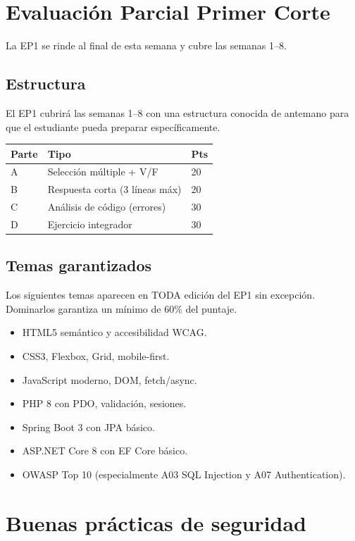 \documentclass[11pt,a4paper,openany]{book}
\begin{document}
\section{Evaluación Parcial Primer Corte}

La EP1 se rinde al final de esta semana y cubre las semanas 1--8.

\subsection{Estructura}

El EP1 cubrirá las semanas 1--8 con una estructura conocida
de antemano para que el estudiante pueda preparar específicamente.


\begin{tabularx}{\textwidth}{lXl}
\toprule
\textbf{Parte} & \textbf{Tipo} & \textbf{Pts}\\
\midrule
A & Selección múltiple + V/F & 20\\
B & Respuesta corta (3 líneas máx) & 20\\
C & Análisis de código (errores) & 30\\
D & Ejercicio integrador & 30\\
\bottomrule
\end{tabularx}

\subsection{Temas garantizados}

Los siguientes temas aparecen en TODA edición del EP1 sin
excepción. Dominarlos garantiza un mínimo de 60\% del puntaje.


\begin{itemize}
\item HTML5 semántico y accesibilidad WCAG.
\item CSS3, Flexbox, Grid, mobile-first.
\item JavaScript moderno, DOM, fetch/async.
\item PHP 8 con PDO, validación, sesiones.
\item Spring Boot 3 con JPA básico.
\item ASP.NET Core 8 con EF Core básico.
\item OWASP Top 10 (especialmente A03 SQL Injection y A07
Authentication).
\end{itemize}

\section{Buenas prácticas de seguridad}
\end{document}
